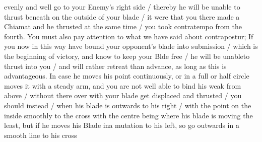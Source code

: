 \newpage


\newpage


evenly and well go to your Enemy's right side / thereby he will be
unable to thrust beneath on the outside of your blade / it were that
you there made a Chiamat and he thrusted at the same time / you took
contratempo from the fourth. You must also pay attention to what we
have said about contrapostur; If you now in this way have bound your
opponent's blade into submission / which is the beginning of victory,
and know to keep your Blde free / he will be unableto thrust into you
/ and will rather retreat than advance, as long as this is
advantageous. In case he moves his point continuously, or in a full or
half circle moves it with a steady arm,
and you are not well able to bind his weak from above / without there
over with your blade get displaced and thrusted / you should instead /
when his blade is outwards to his right / with the point on the inside
smoothly to the cross with the centre being where his blade is moving
the least, but if he moves his Blade ina mutation to his left, so go
outwards in a smooth line to his cross
